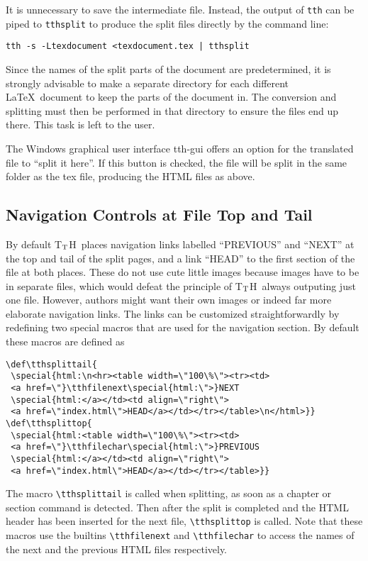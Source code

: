 \documentclass[12pt]{article}
\def\tth{T$_{\rm T}$H}
\begin{document}
It is unnecessary to save the intermediate file. Instead, the output
of \verb!tth! can be piped to \verb!tthsplit! to produce the split
files directly by the command line:

\begin{verbatim}
tth -s -Ltexdocument <texdocument.tex | tthsplit
\end{verbatim}

Since the names of the split parts of the document are predetermined,
it is strongly advisable to make a separate directory for each
different \LaTeX\ document to keep the parts of the document in. The
conversion and splitting must then be performed in that directory to
ensure the files end up there. This task is left to the user.

The Windows graphical user interface tth-gui offers an option for
the translated file to ``split it here''. If this button is checked,
the file will be split in the same folder as the tex file, producing
the HTML files as above.

\subsection{Navigation Controls at File Top and Tail}

By default \tth\ places navigation links labelled ``PREVIOUS'' and
``NEXT'' at the top and tail of the split pages, and a link ``HEAD''
to the first section of the file at both places. These do not use cute
little images because images have to be in separate files, which would
defeat the principle of \tth\ always outputing just one file. However,
authors might want their own images or indeed far more elaborate
navigation links. The links can be customized straightforwardly by
redefining two special macros that are used for the navigation
section. By default these macros are defined as
\begin{verbatim}
\def\tthsplittail{
 \special{html:\n<hr><table width=\"100\%\"><tr><td>
 <a href=\"}\tthfilenext\special{html:\">}NEXT
 \special{html:</a></td><td align=\"right\">
 <a href=\"index.html\">HEAD</a></td></tr></table>\n</html>}}
\def\tthsplittop{
 \special{html:<table width=\"100\%\"><tr><td>
 <a href=\"}\tthfilechar\special{html:\">}PREVIOUS
 \special{html:</a></td><td align=\"right\">
 <a href=\"index.html\">HEAD</a></td></tr></table>}}
\end{verbatim}

The macro \verb!\tthsplittail! is called when splitting, as soon as a
chapter or section command is detected. Then after the split is
completed and the HTML header has been inserted for the next file,
\verb!\tthsplittop! is called. Note that these macros use the
builtins \verb!\tthfilenext! and \verb!\tthfilechar! to access the
names of the next and the previous HTML files respectively.
\end{document}
